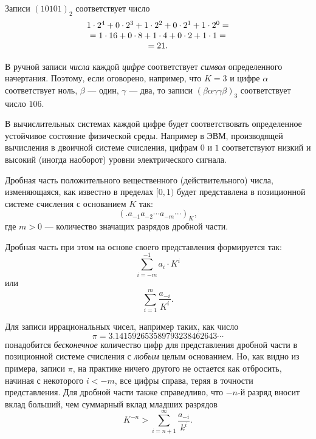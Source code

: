 \begin{exampl}
    Записи $(10101)_{2}$  соответствует число
    \[
        \begin{array}[c]{c}
            1\cdot 2^{4}+
            0\cdot 2^{3}+
            1\cdot 2^{2}+
            0\cdot 2^{1}+
            1\cdot 2^{0} = \\
            =1\cdot 16+
            0\cdot 8+
            1\cdot 4+
            0\cdot 2+
            1\cdot 1 = \\
            = 21.
        \end{array}
    \]
\end{exampl}

\begin{exampl}
    В ручной записи \emph{числа} каждой \emph{цифре} соответствует \emph{символ} определенного начертания. Поэтому, если оговорено, например, что $K=3$ и цифре $\alpha$ соответствует ноль, $\beta$ --- один, $\gamma$ --- два, то записи 
    \(
        (\beta\alpha\gamma\gamma\beta)_3
    \)
    соответствует число $106$. 
\end{exampl}

В вычислительных системах каждой цифре будет соответствовать определенное устойчивое состояние физической среды. Например в ЭВМ, производящей вычисления в двоичной системе счисления, цифрам $0$ и $1$ соответствуют низкий и высокий (иногда наоборот) уровни электрического сигнала.

Дробная часть положительного вещественного (действительного) числа, изменяющаяся, как известно в пределах $[0,1)$ будет представлена в позиционной системе счисления с основанием $K$ так:
\[(.a_{-1}a_{-2}\cdots a_{-m}\cdots)_K,\]
где $m>0$ --- количество значащих разрядов дробной части.

Дробная часть при этом на основе своего представления формируется так:
\begin{equation}\label{eq:ch:ss:floatPart}
        \sum_{i=-m}^{-1}a_{i}\cdot K^{i}
\end{equation}
или
\begin{equation}\label{eq:ch:ss:floatPartAlt}
        \sum_{i=1}^{m}\frac{a_{-i}}{K^{i}}.
\end{equation}

Для записи иррациональных чисел, например таких, как число 
\[\pi=3.141592653589793238462643\cdots\] 
понадобится \emph{бесконечное} количество цифр для представления дробной части в позиционной системе счисления с \emph{любым} целым основанием. Но, как видно из примера, записи $\pi$, на практике ничего другого не остается как отбросить, начиная с некоторого $i<-m$, все цифры справа, теряя в точности представления. Для дробной части также справедливо, что $-n$-й разряд вносит вклад больший, чем суммарный вклад младших разрядов
\[
    K^{-n}>\sum_{i=n+1}^{\infty}\frac{a_{-i}}{k^i}.
\]

